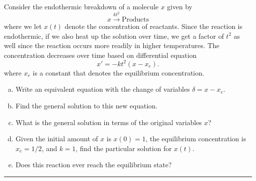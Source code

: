 \documentclass[12pt]{amsbook}
\begin{document}
\newpage
\begin{problem}
Consider the endothermic breakdown of a molecule $x$ given by
\[
x \xrightarrow{kt^2} \textrm{Products}
\]
where we let $x(t)$ denote the concentration of reactants. Since the reaction is endothermic, if we also heat up the solution over time, we get a factor of $t^2$ as well since the reaction occurs more readily in higher temperatures. The concentration decreases over time based on differential equation
\[
x'=-kt^2(x-x_e).
\]
where $x_e$ is a constant that denotes the equilibrium concentration. 
\begin{enumerate}[(a)]
    \item Write an equivalent equation with the change of variables $\delta=x-x_e$.
    \item Find the general solution to this new equation. 
    \item What is the general solution in terms of the original variables $x$?
    \item Given the initial amount of $x$ is $x(0)=1$, the equilibrium concentration is $x_e=1/2$, and $k=1$, find the particular solution for $x(t)$.
    \item Does this reaction ever reach the equilibrium state?
\end{enumerate}
\end{problem}

\hrule
\vspace*{1cm}
\end{document}
